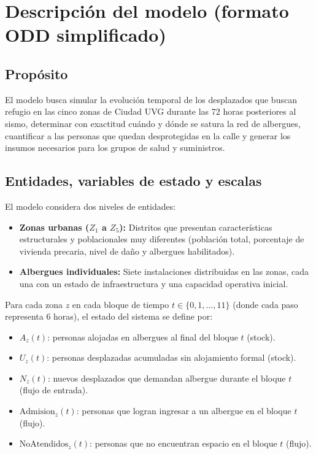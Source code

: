 \documentclass[10pt,letterpaper]{article}
\begin{document}
\section{Descripción del modelo (formato ODD simplificado)}

\subsection{Propósito}
El modelo busca simular la evolución temporal de los desplazados que buscan refugio en las cinco zonas de Ciudad UVG durante las 72 horas posteriores al sismo, determinar con exactitud cuándo y dónde se satura la red de albergues, cuantificar a las personas que quedan desprotegidas en la calle y generar los insumos necesarios para los grupos de salud y suministros.

\subsection{Entidades, variables de estado y escalas}
El modelo considera dos niveles de entidades:
\begin{itemize}
    \item \textbf{Zonas urbanas ($Z_1$ a $Z_5$):} Distritos que presentan características estructurales y poblacionales muy diferentes (población total, porcentaje de vivienda precaria, nivel de daño y albergues habilitados).
    \item \textbf{Albergues individuales:} Siete instalaciones distribuidas en las zonas, cada una con un estado de infraestructura y una capacidad operativa inicial.
\end{itemize}

Para cada zona $z$ en cada bloque de tiempo $t \in \{0, 1, \dots, 11\}$ (donde cada paso representa 6 horas), el estado del sistema se define por:
\begin{itemize}
    \item $A_z(t)$: personas alojadas en albergues al final del bloque $t$ (stock).
    \item $U_z(t)$: personas desplazadas acumuladas sin alojamiento formal (stock).
    \item $N_z(t)$: nuevos desplazados que demandan albergue durante el bloque $t$ (flujo de entrada).
    \item $\text{Admision}_z(t)$: personas que logran ingresar a un albergue en el bloque $t$ (flujo).
    \item $\text{NoAtendidos}_z(t)$: personas que no encuentran espacio en el bloque $t$ (flujo).
\end{itemize}
\end{document}
